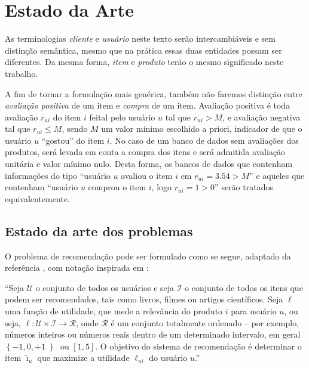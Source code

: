 \chapter[Estado da arte]{Estado da Arte}
\label{chap:estado_da_arte}

As terminologias \textit{cliente} e \textit{usuário} neste texto serão intercambiáveis e sem distinção semântica, mesmo que na prática essas duas entidades possam ser diferentes. Da mesma forma, \textit{item} e \textit{produto} terão o mesmo significado neste trabalho. 

A fim de tornar a formulação mais genérica, também não faremos distinção entre \textit{avaliação positiva} de um item e \textit{compra} de um item. Avaliação positiva é toda avaliação $r_{ui}$ do item $i$ feital pelo usuário $u$ tal que $r_{ui} > M$, e avaliação negativa tal que $r_{ui} \leq M$, sendo $M$ um valor mínimo escolhido a priori, indicador de que o usuário $u$ ``gostou'' do item $i$. No caso de um banco de dados sem avaliações dos produtos, será levada em conta a compra dos itens e será admitida avaliação unitária e valor mínimo nulo. Desta forma, os bancos de dados que contenham informações do tipo ``usuário $u$ avaliou o item $i$ em $r_{ui} = 3.54 > M$'' e aqueles que contenham ``usuário $u$ comprou o item $i$, logo $r_{ui} = 1 > 0$'' serão tratados equivalentemente.


\section{Estado da arte dos problemas} %
\label{sec:estado_da_arte_dos_problemas}

O problema de recomendação pode ser formulado como se segue, adaptado da referência \cite{adomavicius2005toward}, com notação inspirada em \cite{symeonidis2007feature}: 

``Seja $\mathcal{U}$ o conjunto de todos os usuários e seja $\mathcal{I}$ o conjunto de todos os itens que podem ser recomendados, tais como livros, filmes ou artigos científicos. Seja $\ell$ uma função de utilidade, que mede a relevância do produto $i$ para usuário $u$, ou seja, $\ell: \mathcal{U} \times \mathcal{I} \rightarrow \mathcal{R}$, onde $\mathcal{R}$ é um  conjunto totalmente ordenado -- por exemplo, números inteiros ou números reais dentro de um determinado intervalo, em geral $\left\{-1, 0, +1\left\}$ ou $[1, 5]$. O objetivo do sistema de recomendação é determinar o item $\tilde{\imath}_u$ que maximize a utilidade $\ell_{ui}$ do usuário $u$.''

